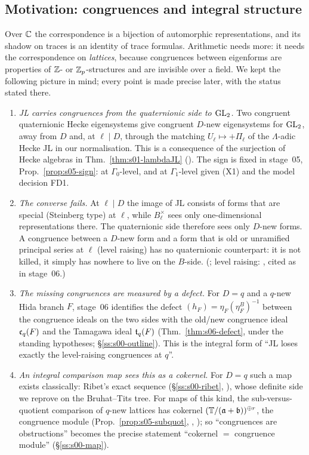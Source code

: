 \subsection{Motivation: congruences and integral structure}\label{ss:s00-why}
Over $\mathbb{C}$ the correspondence is a bijection of automorphic representations, and its shadow on traces is an identity of trace
formulas. Arithmetic needs more: it needs the correspondence on \emph{lattices}, because congruences between eigenforms are
properties of $\mathbb{Z}$- or $\mathbb{Z}_p$-structures and are invisible over a field. We kept the following picture in mind; every point
is made precise later, with the status stated there.
\begin{enumerate}[label=(M\arabic*)]
\item \emph{JL carries congruences from the quaternionic side to $\mathrm{GL}_2$.} Two congruent quaternionic Hecke eigensystems give
  congruent $D$-new eigensystems for $\mathrm{GL}_2$, away from $D$ and, at $\ell\mid D$, through the matching $U_\ell\mapsto+\Pi_\ell$
  of the $\Lambda$-adic Hecke JL in our normalisation. This is a consequence of the surjection of Hecke algebras in
  Thm.~\ref{thm:s01-lambdaJL} (\stcited). The sign is fixed in stage~05, Prop.~\ref{prop:s05-sign}: \stpmc{} at $\Gamma_0$-level, and
  at $\Gamma_1$-level \stpmc{} given (X1) and the model decision FD1.
\item \emph{The converse fails.} At $\ell\mid D$ the image of JL consists of forms that are special (Steinberg type) at $\ell$, while
  $B_\ell^\times$ sees only one-dimensional representations there. The quaternionic side therefore sees only $D$-new forms. A
  congruence between a $D$-new form and a form that is old or unramified principal series at $\ell$ (level raising) has no
  quaternionic counterpart: it is not killed, it simply has nowhere to live on the $B$-side. (\stknown; level raising:
  \cite{Ri84}, cited as in stage~06.)
\item \emph{The missing congruences are measured by a defect.} For $D=q$ and a $q$-new Hida branch $F$, stage~06 identifies the
  defect $(h_F)=\eta_F(\eta^B_F)^{-1}$ between the congruence ideals on the two sides with the old/new congruence ideal
  $\mathfrak{c}_q(F)$ and the Tamagawa ideal $\mathfrak{t}_q(F)$ (Thm.~\ref{thm:s06-defect}, \stpmc{} under the standing hypotheses; \S\ref{ss:s00-outline}).
  This is the integral form of ``JL loses exactly the level-raising congruences at $q$''.
\item \emph{An integral comparison map sees this as a cokernel.} For $D=q$ such a map exists classically: Ribet's exact
  sequence (\S\ref{ss:s00-ribet}, \stcited), whose definite side we reprove on the Bruhat--Tits tree. For maps of this kind, the
  sub-versus-quotient comparison of $q$-new lattices has cokernel $(\mathbb{T}/(\mathfrak{a}+\mathfrak{b}))^{\oplus r}$, the congruence module
  (Prop.~\ref{prop:s05-subquot}, \stproved, \stformal); so ``congruences are obstructions'' becomes the precise statement
  ``cokernel $=$ congruence module'' (\S\ref{ss:s00-map}).
\end{enumerate}

